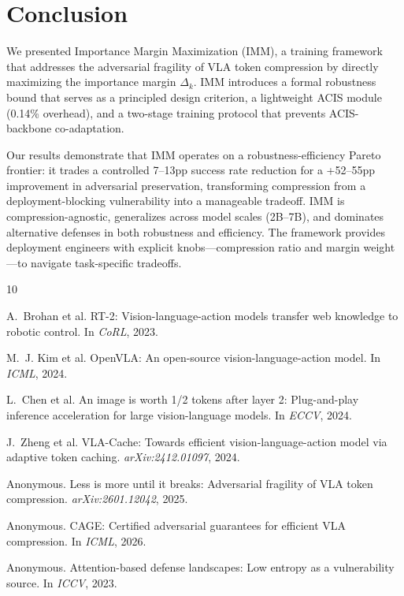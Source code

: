 \documentclass[10pt,twocolumn]{article}
\begin{document}
\section{Conclusion}
\label{sec:conclusion}

We presented Importance Margin Maximization (IMM), a training framework that addresses the adversarial fragility of VLA token compression by directly maximizing the importance margin $\Delta_k$. IMM introduces a formal robustness bound that serves as a principled design criterion, a lightweight ACIS module (0.14\% overhead), and a two-stage training protocol that prevents ACIS-backbone co-adaptation.

Our results demonstrate that IMM operates on a robustness-efficiency Pareto frontier: it trades a controlled 7--13pp success rate reduction for a +52--55pp improvement in adversarial preservation, transforming compression from a deployment-blocking vulnerability into a manageable tradeoff. IMM is compression-agnostic, generalizes across model scales (2B--7B), and dominates alternative defenses in both robustness and efficiency. The framework provides deployment engineers with explicit knobs---compression ratio and margin weight---to navigate task-specific tradeoffs.



\begin{thebibliography}{10}

A.~Brohan et al.
\newblock RT-2: Vision-language-action models transfer web knowledge to robotic control.
\newblock In \emph{CoRL}, 2023.

M.~J. Kim et al.
\newblock OpenVLA: An open-source vision-language-action model.
\newblock In \emph{ICML}, 2024.

L.~Chen et al.
\newblock An image is worth 1/2 tokens after layer 2: Plug-and-play inference acceleration for large vision-language models.
\newblock In \emph{ECCV}, 2024.

J.~Zheng et al.
\newblock VLA-Cache: Towards efficient vision-language-action model via adaptive token caching.
\newblock \emph{arXiv:2412.01097}, 2024.

Anonymous.
\newblock Less is more until it breaks: Adversarial fragility of VLA token compression.
\newblock \emph{arXiv:2601.12042}, 2025.

Anonymous.
\newblock CAGE: Certified adversarial guarantees for efficient VLA compression.
\newblock In \emph{ICML}, 2026.

Anonymous.
\newblock Attention-based defense landscapes: Low entropy as a vulnerability source.
\newblock In \emph{ICCV}, 2023.

\end{thebibliography}
\end{document}
